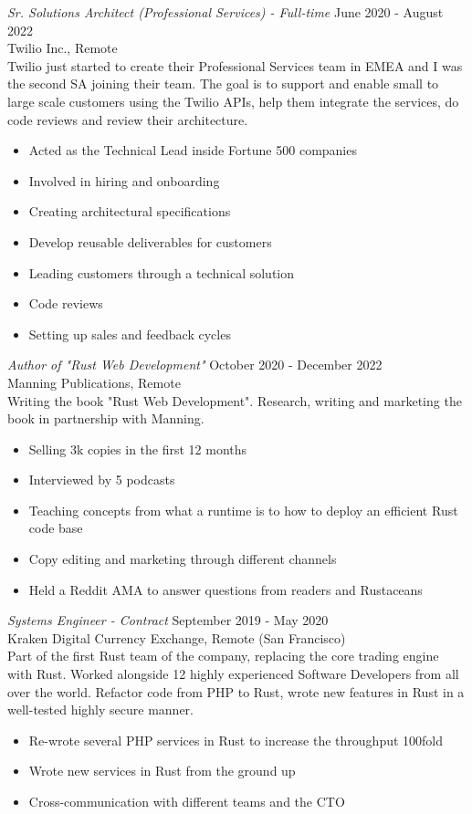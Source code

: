 \documentclass[10pt]{res} %
\begin{document}
\begin{resume}
{\sl Sr. Solutions Architect (Professional Services) - Full-time} \hfill June 2020 - August 2022 \\
Twilio Inc., Remote \\
Twilio just started to create their Professional Services team in EMEA and I was the second SA joining their team. The goal is to support and enable small to large scale customers using the Twilio APIs, help them integrate the services, do code reviews and review their architecture.
\begin{itemize} \itemsep -2pt %
\item Acted as the Technical Lead inside Fortune 500 companies
\item Involved in hiring and onboarding
\item Creating architectural specifications
\item Develop reusable deliverables for customers
\item Leading customers through a technical solution
\item Code reviews
\item Setting up sales and feedback cycles
\end{itemize}

{\sl Author of "Rust Web Development" } \hfill October 2020 - December 2022 \\
Manning Publications, Remote\\
Writing the book "Rust Web Development". Research, writing and marketing the book in partnership with Manning. 
\begin{itemize} \itemsep -2pt %
\item Selling 3k copies in the first 12 months
\item Interviewed by 5 podcasts
\item Teaching concepts from what a runtime is to how to deploy an efficient Rust code base
\item Copy editing and marketing through different channels
\item Held a Reddit AMA to answer questions from readers and Rustaceans
\end{itemize}
 
{\sl Systems Engineer - Contract} \hfill September 2019 - May 2020 \\
Kraken Digital Currency Exchange, Remote (San Francisco)\\
Part of the first Rust team of the company, replacing the core trading engine with Rust. Worked alongside 12 highly experienced Software Developers from all over the world. Refactor code from PHP to Rust, wrote new features in Rust in a well-tested highly secure manner.
\begin{itemize}
	\item Re-wrote several PHP services in Rust to increase the throughput 100fold 
	\item Wrote new services in Rust from the ground up
	\item Cross-communication with different teams and the CTO
\end{itemize}


\end{resume}
\end{document}
